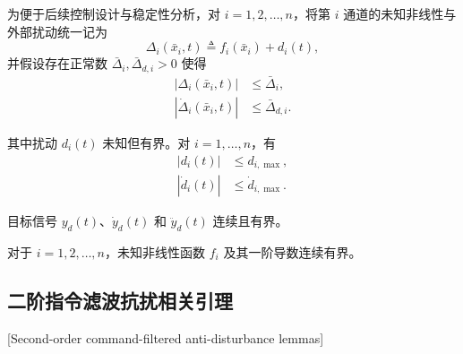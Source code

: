 为便于后续控制设计与稳定性分析，对 $i=1,2,\ldots,n$，将第 $i$ 通道的未知非线性与外部扰动统一记为
\begin{equation}\label{eq:ch3_hi_delta}
\Delta_i(\bar x_i,t)\triangleq f_i(\bar x_i)+d_i(t),
\end{equation}
并假设存在正常数 $\bar\Delta_i,\bar\Delta_{d,i}>0$ 使得
\begin{subequations}
\begin{align}
|\Delta_i(\bar x_i,t)|&\le \bar\Delta_i,\\
|\dot \Delta_i(\bar x_i,t)|&\le \bar\Delta_{d,i}.
\end{align}
\end{subequations}

其中扰动 $d_i(t)$ 未知但有界。对 $i=1,\ldots,n$，有
\begin{subequations}\label{eq:ch4_d_bound}
\begin{align}
\left|d_i(t)\right|&\le d_{i,\max},\\
\left|\dot d_i(t)\right|&\le \dot d_{i,\max}.
\end{align}
\end{subequations}

\begin{assumption}\label{assump:ch3_yd}
目标信号 $y_d(t)$、$\dot y_d(t)$ 和 $\ddot y_d(t)$ 连续且有界。
\end{assumption}

\begin{assumption}\label{assump:ch3_fi}
对于 $i=1,2,\ldots,n$，未知非线性函数 $f_i$ 及其一阶导数连续有界。
\end{assumption}

\subsection{二阶指令滤波抗扰相关引理}[Second-order command-filtered anti-disturbance lemmas]

